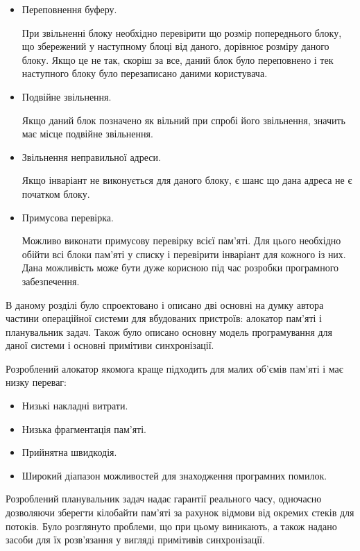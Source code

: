\documentclass[main.tex]{subfiles}
\begin{document}
\begin{itemize}
\item Переповнення буферу.

  При звільненні блоку необхідно перевірити що розмір попереднього блоку, що збережений у наступному блоці від даного, дорівнює розміру даного блоку. Якщо це не так, скоріш за все, даний блок було переповнено і тек наступного блоку було перезаписано даними користувача.

\item Подвійне звільнення.

  Якщо даний блок позначено як вільний при спробі його звільнення, значить має місце подвійне звільнення.

\item Звільнення неправильної адреси.

  Якщо інваріант не виконується для даного блоку, є шанс що дана адреса не є початком блоку.

\item Примусова перевірка.

  Можливо виконати примусову перевірку всієї пам'яті. Для цього необхідно обійти всі блоки пам'яті у списку і перевірити інваріант для кожного із них. Дана можливість може бути дуже корисною під час розробки програмного забезпечення.
\end{itemize}

\chapterconslusions{}

В даному розділі було спроектовано і описано дві основні на думку автора частини операційної системи для вбудованих пристроїв: алокатор пам'яті і планувальник задач. Також було описано основну модель програмування для даної системи і основні примітиви синхронізації.

Розроблений алокатор якомога краще підходить для малих об'ємів пам'яті і має низку переваг:
\begin{itemize}[nosep]
\item Низькі накладні витрати.
\item Низька фрагментація пам'яті.
\item Прийнятна швидкодія.
\item Широкий діапазон можливостей для знаходження програмних помилок.
\end{itemize}

Розроблений планувальник задач надає гарантії реального часу, одночасно дозволяючи зберегти кілобайти пам'яті за рахунок відмови від окремих стеків для потоків. Було розглянуто проблеми, що при цьому виникають, а також надано засоби для їх розв'язання у вигляді примітивів синхронізації.
\end{document}
